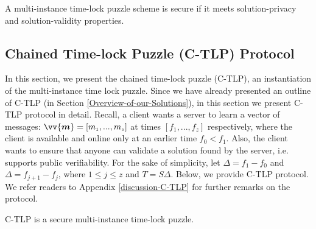 % 
\begin{definition}\label{def::C-TLP-security} A multi-instance time-lock puzzle scheme  is secure if it meets solution-privacy and solution-validity properties. 
\end{definition}


\subsection{Chained  Time-lock Puzzle (C-TLP) Protocol}\label{Section::C-TLP-protocol}


In this section, we present the chained  time-lock puzzle (C-TLP), an instantiation of the multi-instance time lock puzzle. Since we have already presented an outline of C-TLP (in Section \ref{Overview-of-our-Solutions}), in this section we present C-TLP protocol in detail.  Recall, a client wants a server to learn a vector of messages: $\vv{\bm{m}}=[m_{\scriptscriptstyle 1},...,m_{\scriptscriptstyle z}]$ at times  $[f_{\scriptscriptstyle 1},...,f_{\scriptscriptstyle z}]$ respectively, where the client is available and online only at an earlier time $f_{\scriptscriptstyle 0}< f_{\scriptscriptstyle 1}$.  Also, the client wants to ensure that anyone can validate a solution found by the  server, i.e. supports public verifiability. For the sake of simplicity, let $\Delta=f_{\scriptscriptstyle 1}-f_{\scriptscriptstyle 0}$ and $\Delta=f_{\scriptscriptstyle j+1}-f_{\scriptscriptstyle j}$, where $1\leq j \leq z$ and $T=S \Delta$. Below, we provide C-TLP protocol. We refer readers to Appendix \ref{discussion-C-TLP} for further remarks on the protocol. 




   \begin{theorem}\label{C-TLP-Sec}  C-TLP  is a secure multi-instance time-lock puzzle. 
   \end{theorem}


